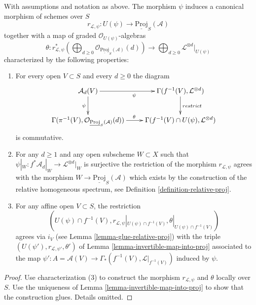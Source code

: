 \begin{lemma}
\label{lemma-invertible-map-into-relative-proj}
With assumptions and notation as above. The morphism
$\psi$ induces a canonical morphism of schemes over $S$
$$
r_{\mathcal{L}, \psi} :
U(\psi) \longrightarrow \underline{\text{Proj}}_S(\mathcal{A})
$$
together with a map of graded $\mathcal{O}_{U(\psi)}$-algebras
$$
\theta :
r_{\mathcal{L}, \psi}^*\left(
\bigoplus\nolimits_{d \geq 0}
\mathcal{O}_{\underline{\text{Proj}}_S(\mathcal{A})}(d)
\right)
\longrightarrow
\bigoplus\nolimits_{d \geq 0} \mathcal{L}^{\otimes d}|_{U(\psi)}
$$
characterized by the following properties:
\begin{enumerate}
\item For every open $V \subset S$ and every $d \geq 0$ the diagram
$$
\xymatrix{
\mathcal{A}_d(V) \ar[d]_{\psi} \ar[r]_{\psi} &
\Gamma(f^{-1}(V), \mathcal{L}^{\otimes d}) \ar[d]^{restrict} \\
\Gamma(\pi^{-1}(V),
\mathcal{O}_{\underline{\text{Proj}}_S(\mathcal{A})}(d)) \ar[r]^{\theta} &
\Gamma(f^{-1}(V) \cap U(\psi), \mathcal{L}^{\otimes d})
}
$$
is commutative.
\item For any $d \geq 1$ and any open subscheme $W \subset X$
such that $\psi|_W : f^*\mathcal{A}_d|_W \to \mathcal{L}^{\otimes d}|_W$
is surjective the restriction of the morphism $r_{\mathcal{L}, \psi}$
agrees with the morphism $W \to \underline{\text{Proj}}_S(\mathcal{A})$
which exists by the construction of the relative homogeneous spectrum,
see Definition \ref{definition-relative-proj}.
\item For any affine open $V \subset S$, the restriction
$$
(U(\psi) \cap f^{-1}(V), r_{\mathcal{L}, \psi}|_{U(\psi) \cap f^{-1}(V)},
\theta|_{U(\psi) \cap f^{-1}(V)})
$$
agrees via $i_V$ (see Lemma \ref{lemma-glue-relative-proj}) with the triple
$(U(\psi'), r_{\mathcal{L}, \psi'}, \theta')$
of Lemma \ref{lemma-invertible-map-into-proj} associated to the map
$\psi' : A = \mathcal{A}(V) \to \Gamma_*(f^{-1}(V), \mathcal{L}|_{f^{-1}(V)})$
induced by $\psi$.
\end{enumerate}
\end{lemma}

\begin{proof}
Use characterization (3) to construct the morphism $r_{\mathcal{L}, \psi}$
and $\theta$ locally over $S$. Use the uniqueness of
Lemma \ref{lemma-invertible-map-into-proj}
to show that the construction glues. Details omitted.
\end{proof}







